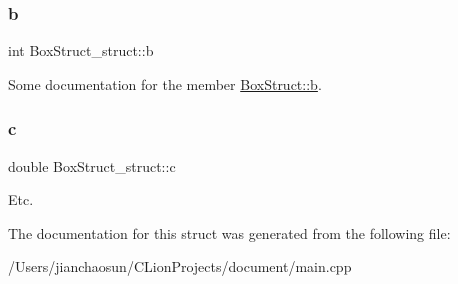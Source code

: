 \subsubsection{\texorpdfstring{b}{b}}
{\footnotesize\ttfamily int Box\+Struct\+\_\+struct\+::b}

Some documentation for the member \mbox{\hyperlink{struct_box_struct__struct_aee44748dc579c5d794853ee8b133d197}{Box\+Struct\+::b}}. \mbox{\label{struct_box_struct__struct_a4543370ed67b2cf5ae3f55201bea11e6}} 
\subsubsection{\texorpdfstring{c}{c}}
{\footnotesize\ttfamily double Box\+Struct\+\_\+struct\+::c}

Etc. 

The documentation for this struct was generated from the following file\+:\begin{DoxyCompactItemize}
\item 
/\+Users/jianchaosun/\+C\+Lion\+Projects/document/main.\+cpp\end{DoxyCompactItemize}
